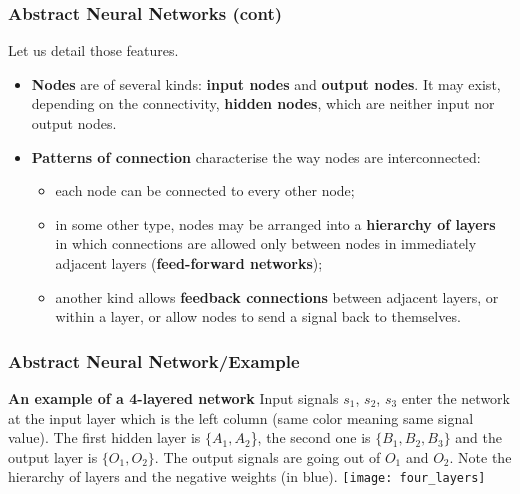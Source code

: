 %
\begin{frame}
\frametitle{Abstract Neural Networks (cont)}

Let us detail those features.
\begin{itemize}

  \item \textbf{Nodes} are of several kinds: \textbf{input nodes} and
  \textbf{output nodes}. It may exist, depending on the connectivity,
  \textbf{hidden nodes}, which are neither input nor output nodes.

  \item \textbf{Patterns of connection} characterise the way nodes are
  interconnected:

  \begin{itemize}

    \item each node can be connected to every other node;

    \item in some other type, nodes may be arranged into a
    \textbf{hierarchy of layers} in which connections are allowed only
    between nodes in immediately adjacent layers (\textbf{feed-forward
    networks});

    \item another kind allows \textbf{feedback connections} between
    adjacent layers, or within a layer, or allow nodes to send a
    signal back to themselves.

  \end{itemize}

\end{itemize}

\end{frame}

%
\begin{frame}
\frametitle{Abstract Neural Network/Example}

\textbf{An example of a 4-layered network} Input signals $s_1$, $s_2$,
$s_3$ enter the network at the input layer which is the left column
(same color meaning same signal value). The first hidden layer is
$\{A_1, A_2$\}, the second one is $\{B_1, B_2, B_3\}$ and the output
layer is $\{O_1, O_2\}$. The output signals are going out of $O_1$ and
$O_2$. Note the hierarchy of layers and the negative weights (in
blue).
\vfill
\centering\texttt{[image: four\_layers]}

\end{frame}

